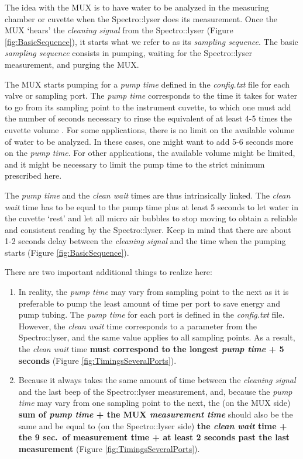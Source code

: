 \documentclass[]{book}
\begin{document}
The idea with the MUX is to have water to be analyzed in the measuring chamber or cuvette when the Spectro::lyser does its measurement. Once the MUX `hears' the \emph{cleaning signal} from the Spectro::lyser (Figure \ref{fig:BasicSequence}), it starts what we refer to as its \emph{sampling sequence}. The basic \emph{sampling sequence} consists in pumping, waiting for the Spectro::lyser measurement, and purging the MUX.

The MUX starts pumping for a \emph{pump time} defined in the \emph{config.txt} file for each valve or sampling port. The \emph{pump time} corresponds to the time it takes for water to go from its sampling point to the instrument cuvette, to which one must add the number of seconds necessary to rinse the equivalent of at least 4-5 times the cuvette volume \citep{Birgand2016-to}. For some applications, there is no limit on the available volume of water to be analyzed. In these cases, one might want to add 5-6 seconds more on the \emph{pump time}. For other applications, the available volume might be limited, and it might be necessary to limit the pump time to the strict minimum prescribed here.

The \emph{pump time} and the \emph{clean wait} times are thus intrinsically linked. The \emph{clean wait} time has to be equal to the pump time plus at least 5 seconds to let water in the cuvette `rest' and let all micro air bubbles to stop moving to obtain a reliable and consistent reading by the Spectro::lyser. Keep in mind that there are about 1-2 seconds delay between the \emph{cleaning signal} and the time when the pumping starts (Figure \ref{fig:BasicSequence}).

There are two important additional things to realize here:

\begin{enumerate}
\def\labelenumi{\arabic{enumi}.}
\item
  In reality, the \emph{pump time} may vary from sampling point to the next as it is preferable to pump the least amount of time per port to save energy and pump tubing. The \emph{pump time} for each port is defined in the \emph{config.txt} file. However, the \emph{clean wait} time corresponds to a parameter from the Spectro::lyser, and the same value applies to all sampling points. As a result, the \emph{clean wait} time \textbf{must correspond to the longest \emph{pump time} + 5 seconds} (Figure \ref{fig:TimingsSeveralPorts}).
\item
  Because it always takes the same amount of time between the \emph{cleaning signal} and the last beep of the Spectro::lyser measurement, and, because the \emph{pump time} may vary from one sampling point to the next, the (on the MUX side) \textbf{sum of \emph{pump time} + the MUX \emph{measurement time}} should also be the same and be equal to (on the Spectro::lyser side) \textbf{the \emph{clean wait} time + the 9 sec.~of measurement time + at least 2 seconds past the last measurement} (Figure \ref{fig:TimingsSeveralPorts}).
\end{enumerate}
\end{document}
